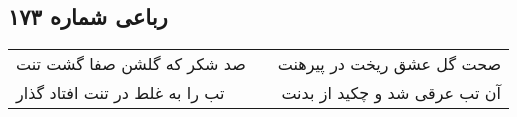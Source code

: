 \begin{center}
\section*{رباعی شماره ۱۷۳}
\label{sec:sh173}
\begin{longtable}{l p{0.5cm} r}
صد شکر که گلشن صفا گشت تنت
&&
صحت گل عشق ریخت در پیرهنت
\\
تب را به غلط در تنت افتاد گذار
&&
آن تب عرقی شد و چکید از بدنت
\\
\end{longtable}
\end{center}
